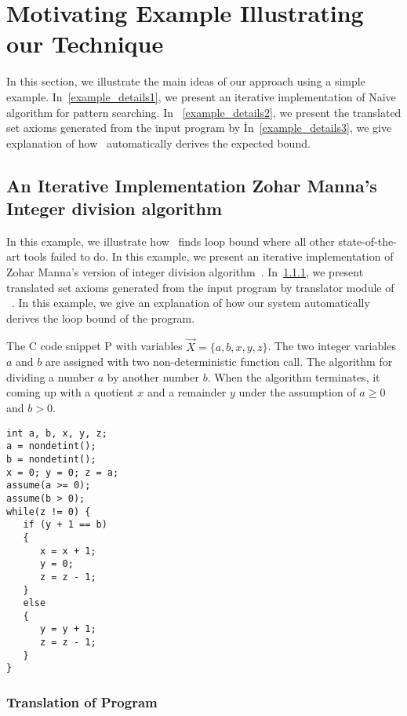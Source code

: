 \section{Motivating Example Illustrating our Technique}
\label{sec:overview}
In this section,  we illustrate the main ideas of our approach using a simple example. In~\ref{example_details1},
we present an iterative implementation of Naive algorithm for pattern searching. In ~\ref{example_details2}, we present the translated set axioms generated from the input program by \SystemName\. In~\ref{example_details3}, we give explanation of how \SystemName\ automatically derives the expected bound. 


\subsection{An Iterative Implementation Zohar Manna's  Integer division algorithm}\label{example1_1}

In this example, we illustrate how \SystemName\ finds loop bound where all other state-of-the-art tools failed to do. 
In this example, we present an iterative implementation of Zohar Manna's version of integer division algorithm~\cite{Manna:1974:IMT:542899}.
In~\ref{example1_2}, we present translated set axioms generated from
the input program by translator module of \SystemName\ . In this example, we give an explanation of how our system automatically derives the loop bound of the program.

The C code snippet P with variables $\vec{X}=\{a,b,x,y,z\}$. The two integer variables $a$ and $b$ are assigned with two non-deterministic function call. The algorithm for dividing a number $a$ by another number $b$. When the algorithm terminates, it coming up with a quotient $x$ and a remainder $y$ under the assumption of $a\geq 0$ and $b>0$.


\begin{verbatim}
int a, b, x, y, z;
a = nondetint(); 
b = nondetint();
x = 0; y = 0; z = a;
assume(a >= 0);  
assume(b > 0);
while(z != 0) {
   if (y + 1 == b)  
   { 
      x = x + 1;  
      y = 0;  
      z = z - 1; 
   }
   else 
   { 
      y = y + 1; 
      z = z - 1; 
   }
}
\end{verbatim}

\subsubsection{Translation of Program}\label{example1_2}


